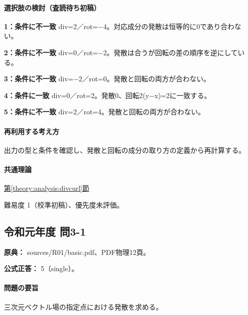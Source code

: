\paragraph{選択肢の検討（査読待ち初稿）}\mbox{}\par

\noindent\textbf{1：条件に不一致} div=\allowbreak{}2／rot=−4。対応成分の発散は恒等的に0であり合わない。\par

\noindent\textbf{2：条件に不一致} div=\allowbreak{}0／rot=−2。発散は合うが回転の差の順序を逆にしている。\par

\noindent\textbf{3：条件に不一致} div=−2／rot=\allowbreak{}0。発散と回転の両方が合わない。\par

\noindent\textbf{4：条件に一致} div=\allowbreak{}0／rot=\allowbreak{}2。発散0、回転2(y−x)=\allowbreak{}2に一致する。\par

\noindent\textbf{5：条件に不一致} div=\allowbreak{}2／rot=\allowbreak{}4。発散と回転の両方が合わない。\par

\paragraph{再利用する考え方} 出力の型と条件を確認し、発散と回転の成分の取り方の定義から再計算する。

\paragraph{共通理論} \hyperref[theory:analysis:divcurl]{第\ref*{theory:analysis:divcurl}節}

\par 難易度 1（校準初稿）、優先度未評価。

\subsection{令和元年度 問3-1}
\label{q:r01-reg-basic-3-1}

\noindent\textbf{原典：} sources/R01/basic.pdf、PDF物理12頁。

\textbf{公式正答：} 5（single）。

\paragraph{問題の要旨} 三次元ベクトル場の指定点における発散を求める。

